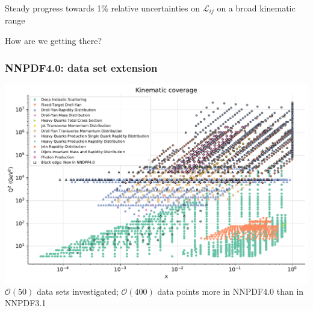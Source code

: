 \documentclass{beamer}
\begin{document}
\begin{frame}
\begin{overlayarea}{\textwidth}{5.2cm}
{\begin{columns}[c]
\begin{column}{0.5\textwidth}
   \end{column}
  \end{columns}  
  }   
 \end{overlayarea}
 \begin{alertblock}{}
  \centering
  Steady progress towards 1\% relative uncertainties on $\mathcal{L}_{ij}$ on a broad kinematic range\\
 \end{alertblock}
 \vspace{-0.1cm}
 \begin{block}{}
  \centering
  How are we getting there?\\
 \end{block}
\end{frame}

\begin{frame}
 \frametitle{NNPDF4.0: data set extension}
 \footnotesize
 \centering
 \includegraphics[width=\textwidth]{plots/Markers0_plot_xq2}\\
 $\mathcal{O}(50)$ data sets investigated; $\mathcal{O}(400)$ data points more in NNPDF4.0 than in NNPDF3.1
\end{frame}
\end{document}
